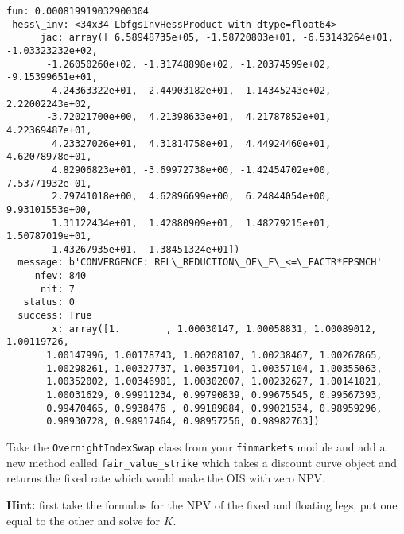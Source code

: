 \begin{Answer}
\begin{tcolorbox}[breakable, size=fbox, boxrule=1pt, pad at break*=1mm,colback=cellbackground, colframe=cellborder]
\begin{Verbatim}[commandchars=\\\{\}]
      fun: 0.000819919032900304
 hess\_inv: <34x34 LbfgsInvHessProduct with dtype=float64>
      jac: array([ 6.58948735e+05, -1.58720803e+01, -6.53143264e+01,
-1.03323232e+02,
       -1.26050260e+02, -1.31748898e+02, -1.20374599e+02, -9.15399651e+01,
       -4.24363322e+01,  2.44903182e+01,  1.14345243e+02,  2.22002243e+02,
       -3.72021700e+00,  4.21398633e+01,  4.21787852e+01,  4.22369487e+01,
        4.23327026e+01,  4.31814758e+01,  4.44924460e+01,  4.62078978e+01,
        4.82906823e+01, -3.69972738e+00, -1.42454702e+00,  7.53771932e-01,
        2.79741018e+00,  4.62896699e+00,  6.24844054e+00,  9.93101553e+00,
        1.31122434e+01,  1.42880909e+01,  1.48279215e+01,  1.50787019e+01,
        1.43267935e+01,  1.38451324e+01])
  message: b'CONVERGENCE: REL\_REDUCTION\_OF\_F\_<=\_FACTR*EPSMCH'
     nfev: 840
      nit: 7
   status: 0
  success: True
        x: array([1.        , 1.00030147, 1.00058831, 1.00089012, 1.00119726,
       1.00147996, 1.00178743, 1.00208107, 1.00238467, 1.00267865,
       1.00298261, 1.00327737, 1.00357104, 1.00357104, 1.00355063,
       1.00352002, 1.00346901, 1.00302007, 1.00232627, 1.00141821,
       1.00031629, 0.99911234, 0.99790839, 0.99675545, 0.99567393,
       0.99470465, 0.9938476 , 0.99189884, 0.99021534, 0.98959296,
       0.98930728, 0.98917464, 0.98957256, 0.98982763])
\end{Verbatim}
\end{tcolorbox}
\end{Answer}

\begin{Exercise}[title={(OvernightIndexSwap fair value)}]
Take the \texttt{OvernightIndexSwap} class from your \texttt{finmarkets} module and add a new method called \texttt{fair\_value\_strike} which takes a discount curve object and returns the fixed rate which would make the OIS with zero NPV.

\textbf{Hint:} first take the formulas for the NPV of the fixed and floating legs, put one equal to the other and solve for $K$.
\end{Exercise}

